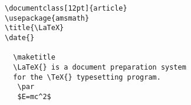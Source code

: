\newpage

\begin{verbatim}
\documentclass[12pt]{article}
\usepackage{amsmath}
\title{\LaTeX}
\date{}

  \maketitle 
  \LaTeX{} is a document preparation system 
  for the \TeX{} typesetting program.
   \par 
   $E=mc^2$

\end{verbatim}


